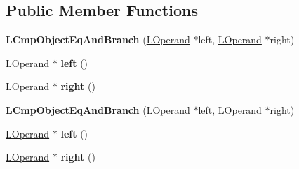 \subsection*{Public Member Functions}
\begin{DoxyCompactItemize}
\item 
{\bfseries L\+Cmp\+Object\+Eq\+And\+Branch} (\hyperlink{classv8_1_1internal_1_1_l_operand}{L\+Operand} $\ast$left, \hyperlink{classv8_1_1internal_1_1_l_operand}{L\+Operand} $\ast$right)\hypertarget{classv8_1_1internal_1_1_l_cmp_object_eq_and_branch_a7d76fa0ef7cc54b5aa0cbc001196a8e8}{}\label{classv8_1_1internal_1_1_l_cmp_object_eq_and_branch_a7d76fa0ef7cc54b5aa0cbc001196a8e8}

\item 
\hyperlink{classv8_1_1internal_1_1_l_operand}{L\+Operand} $\ast$ {\bfseries left} ()\hypertarget{classv8_1_1internal_1_1_l_cmp_object_eq_and_branch_afb4cdbb8d1366c305042340347da59b5}{}\label{classv8_1_1internal_1_1_l_cmp_object_eq_and_branch_afb4cdbb8d1366c305042340347da59b5}

\item 
\hyperlink{classv8_1_1internal_1_1_l_operand}{L\+Operand} $\ast$ {\bfseries right} ()\hypertarget{classv8_1_1internal_1_1_l_cmp_object_eq_and_branch_a9a007c4e4fe2f797412cf8596e2af560}{}\label{classv8_1_1internal_1_1_l_cmp_object_eq_and_branch_a9a007c4e4fe2f797412cf8596e2af560}

\item 
{\bfseries L\+Cmp\+Object\+Eq\+And\+Branch} (\hyperlink{classv8_1_1internal_1_1_l_operand}{L\+Operand} $\ast$left, \hyperlink{classv8_1_1internal_1_1_l_operand}{L\+Operand} $\ast$right)\hypertarget{classv8_1_1internal_1_1_l_cmp_object_eq_and_branch_a7d76fa0ef7cc54b5aa0cbc001196a8e8}{}\label{classv8_1_1internal_1_1_l_cmp_object_eq_and_branch_a7d76fa0ef7cc54b5aa0cbc001196a8e8}

\item 
\hyperlink{classv8_1_1internal_1_1_l_operand}{L\+Operand} $\ast$ {\bfseries left} ()\hypertarget{classv8_1_1internal_1_1_l_cmp_object_eq_and_branch_afb4cdbb8d1366c305042340347da59b5}{}\label{classv8_1_1internal_1_1_l_cmp_object_eq_and_branch_afb4cdbb8d1366c305042340347da59b5}

\item 
\hyperlink{classv8_1_1internal_1_1_l_operand}{L\+Operand} $\ast$ {\bfseries right} ()\hypertarget{classv8_1_1internal_1_1_l_cmp_object_eq_and_branch_a9a007c4e4fe2f797412cf8596e2af560}{}\label{classv8_1_1internal_1_1_l_cmp_object_eq_and_branch_a9a007c4e4fe2f797412cf8596e2af560}


\end{DoxyCompactItemize}
